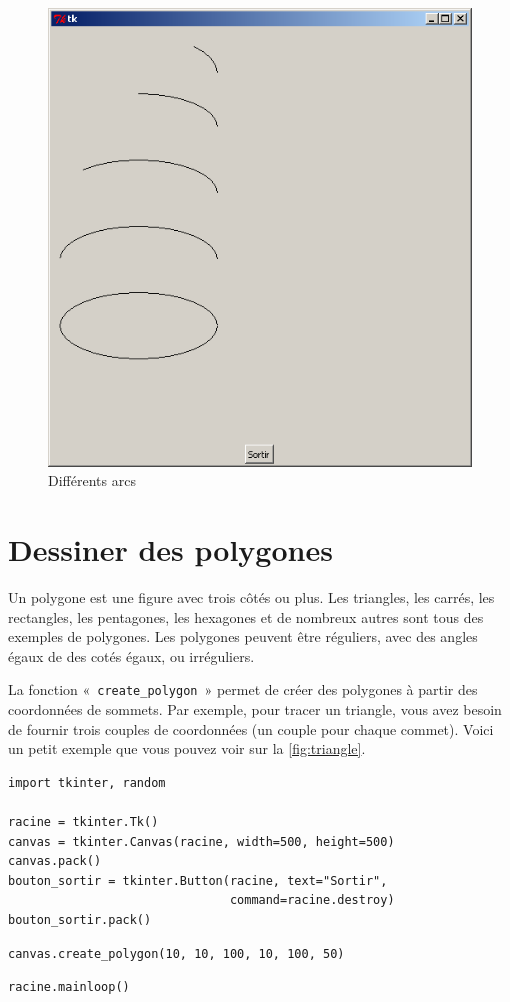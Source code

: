 \begin{figure}[h!]
\centering
\includegraphics[scale=0.4]{images/arcs}
\caption{Différents arcs}\label{fig:arcs}
\end{figure}


\section{Dessiner des polygones}
Un polygone est une figure avec trois côtés ou plus. 
Les triangles, les carrés, les rectangles, les pentagones, les hexagones et de nombreux autres sont tous des exemples de polygones. Les polygones peuvent être réguliers, avec des angles égaux de des cotés égaux, ou irréguliers. 

La fonction «~\texttt{create\_polygon}~» permet de créer des polygones à partir des coordonnées de sommets.
Par exemple, pour tracer un triangle, vous avez besoin de fournir trois couples de coordonnées (un couple pour chaque commet). Voici un petit exemple que vous pouvez voir sur la \autoref{fig:triangle}.

\begin{Verbatim}[frame=single,rulecolor=\color{mbleu}, label=à taper ne sera pas répété]
import tkinter, random

racine = tkinter.Tk()
canvas = tkinter.Canvas(racine, width=500, height=500)
canvas.pack()
bouton_sortir = tkinter.Button(racine, text="Sortir",
                               command=racine.destroy)
bouton_sortir.pack()
\end{Verbatim}
\begin{Verbatim}[frame=single,rulecolor=\color{mbleu}, label=à taper]
canvas.create_polygon(10, 10, 100, 10, 100, 50)
\end{Verbatim}
\begin{Verbatim}[frame=single,rulecolor=\color{mbleu}, label=à taper ne sera pas répété]
racine.mainloop()
\end{Verbatim}

